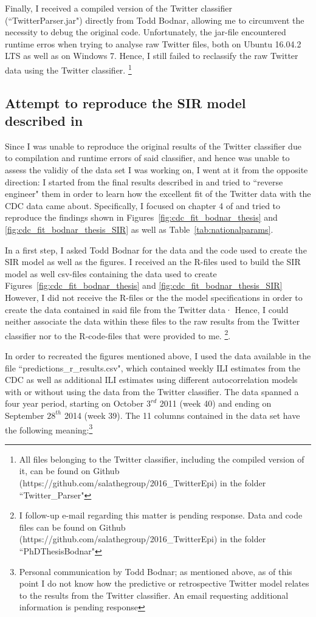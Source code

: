 \documentclass[11pt, a4paper]{report}\usepackage[]{graphicx}\usepackage[]{color}
\begin{document}
Finally, I received a compiled version of the Twitter classifier (``TwitterParser.jar") directly from Todd Bodnar, allowing me to circumvent the necessity to debug the original code.  Unfortunately, the jar-file encountered runtime erros when trying to analyse raw Twitter files, both on Ubuntu 16.04.2 LTS as well as on Windows 7. Hence, I still failed to reclassify the raw Twitter data using the Twitter classifier. \footnote{All files belonging to the Twitter classifier, including the compiled version of it, can be found on Github (https://github.com/salathegroup/2016\_TwitterEpi) in the folder ``Twitter\_Parser"}

\subsection{Attempt to reproduce the SIR model described in \citep{bodnar_data_2015}}
Since I was unable to reproduce the original results of the Twitter classifier due to compilation and runtime errors of said classifier, and hence was unable to assess the validiy of the data set I was working on, I went at it from the opposite direction: I started from the final results described in \citep{bodnar_data_2015} and tried to ``reverse engineer" them in order to learn how the excellent fit of the Twitter data with the CDC data came about. Specifically, I focused on chapter 4 of \citep{bodnar_data_2015} and tried to reproduce the findings shown in Figures~\ref{fig:cdc_fit_bodnar_thesis} and \ref{fig:cdc_fit_bodnar_thesis_SIR} as well as Table~\ref{tab:nationalparams}.\newline

In a first step, I asked Todd Bodnar for the data and the code used to create the SIR model as well as the figures. I received an the R-files used to build the SIR model as well csv-files containing the data used to create Figures~\ref{fig:cdc_fit_bodnar_thesis} and \ref{fig:cdc_fit_bodnar_thesis_SIR}  However, I did not receive the R-files or the the model specifications in order to create the data contained in said file from the Twitter data· Hence, I could neither associate the data within these files to the raw results from the Twitter classifier nor to the R-code-files that were provided to me. \footnote{I follow-up e-mail regarding this matter is pending response. Data and code files can be found on Github (https://github.com/salathegroup/2016\_TwitterEpi) in the folder ``PhDThesisBodnar"}.\newline

In order to recreated the figures mentioned above, I used the data available in the file ``predictions\_r\_results.csv", which contained weekly ILI estimates from the CDC as well as additional ILI estimates using different autocorrelation models with or without using the data from the Twitter classifier. The data spanned a four year period, starting on October $3^{rd}$ 2011 (week 40) and ending on September $28^{th}$ 2014 (week 39). The 11 columns contained in the data set have the following meaning:\footnote{Personal communication by Todd Bodnar; as mentioned above, as of this point I do not know how the predictive or retrospective Twitter model relates to the results from the Twitter classifier. An email requesting additional information is pending response}  
\end{document}
